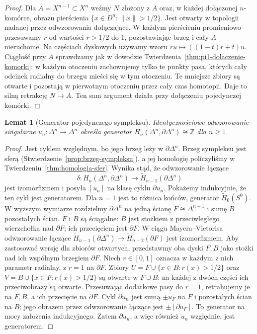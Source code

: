\documentclass[11pt,a4paper,oneside]{report}
\newcommand{\Z}{\mathbb{Z}}
\theoremstyle{plain}
\newtheorem{lemat}[twierdzenie]{Lemat}
\theoremstyle{definition}
\theoremstyle{remark}
\begin{document}
\begin{proof}
Dla $A=X^{n-1}\subset X^n$
weźmy $N$ złożony z $A$ oraz,
w każdej dołączonej $n$-komórce,
obrazu pierścienia
$\{x\in D^n:\|x\|>1/2\}$.
Jest otwarty w topologii
nadanej przez odwzorowania dołączające.
W każdym pierścieniu promieniowo
przesuwamy $r$ od wartości
$r>1/2$ do $1$, pozostawiając
brzeg i cały $A$ nieruchome.
Na częściach dyskowych używamy wzoru
$ru\mapsto((1-t)r+t)u$. Ciągłość przy $A$ sprawdzamy jak
w dowodzie Twierdzenia~\ref{thm:pi1-dolaczenie-komorki}:
w każdym otoczeniu zachowujemy tylko te punkty pasa, których
cały odcinek radialny do brzegu mieści się w tym otoczeniu.
Te mniejsze zbiory są otwarte i pozostają w pierwotnym otoczeniu
przez cały czas homotopii. Daje to silną retrakcję $N\to A$.
Ten sam argument działa przy dołączeniu pojedynczej komórki.
\end{proof}

\begin{lemat}[Generator pojedynczego sympleksu]
\label{lem:orientacja-simpleksu}
Identycznościowe odwzorowanie singularne
$u_n:\Delta^n\to\Delta^n$ określa
generator
$H_n(\Delta^n,\partial\Delta^n)\cong\Z$
dla $n\geq1$.
\end{lemat}
\begin{proof}
Jest cyklem względnym, bo jego
brzeg leży w $\partial\Delta^n$.
Brzeg sympleksu jest sferą
(Stwierdzenie~\ref{prop:brzeg-sympleksu}),
a jej homologię policzyliśmy
w Twierdzeniu~\ref{thm:homologia-sfer}.
Wynika stąd, że odwzorowanie łączące
\[
 \delta:H_n(\Delta^n,\partial\Delta^n)
 \longrightarrow
 \widetilde H_{n-1}(\partial\Delta^n)
 \]
jest izomorfizmem i posyła
$[u_n]$ na klasę cyklu
$\partial u_n$.
Pokażemy indukcyjnie, że ten
cykl jest generatorem.
Dla $n=1$ jest to różnica
końców, generator
$\widetilde H_0(S^0)$.
W wyższym wymiarze rozdzielmy
$\partial\Delta^n$ na jedną
ścianę $F\cong\Delta^{n-1}$
i sumę $B$ pozostałych ścian.
$F$ i $B$ są ściągalne:
$B$ jest stożkiem z przeciwległego
wierzchołka nad $\partial F$;
ich przecięciem jest $\partial F$.
W ciągu Mayera--Vietorisa
odwzorowanie łączące
$\widetilde H_{n-1}(\partial\Delta^n)
\to\widetilde H_{n-2}(\partial F)$
jest izomorfizmem. Aby zastosować wersję dla zbiorów otwartych, przedstawmy
oba dyski $F,B$ jako stożki nad ich wspólnym brzegiem $\partial F$.
Niech $r\in[0,1]$ oznacza w każdym z nich parametr radialny,
z $r=1$ na $\partial F$. Zbiory
$U=F\cup\{x\in B:r(x)>1/2\}$ oraz
$V=B\cup\{x\in F:r(x)>1/2\}$ są otwarte w $F\cup B$:
na każdej z dwóch części ich przeciwobrazy są otwarte.
Przesuwając dodatkowe pasy do $r=1$, retrahujemy je na $F,B$,
a ich przecięcie na $\partial F$.
Cykl $\partial u_n$ jest sumą
$\pm u_F$ na $F$ i pozostałych
ścian na $B$; jego obrazem przez
odwzorowanie łączące jest
$\pm[\partial u_F]$.
To generator na mocy
założenia indukcyjnego.
Zatem $\partial u_n$, a więc
również $u_n$ względnie,
jest generatorem.
\end{proof}
\end{document}
